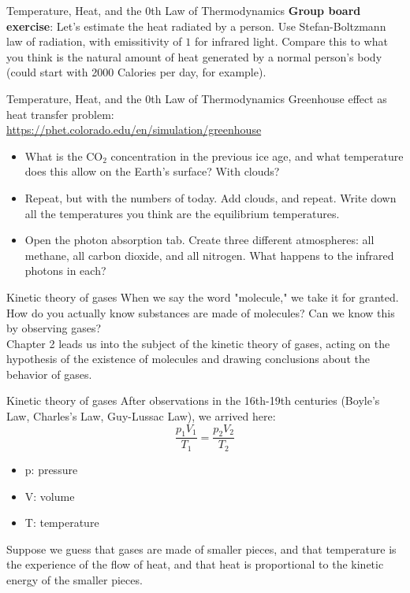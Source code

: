 \documentclass{beamer}
\begin{document}
\begin{frame}{Temperature, Heat, and the 0th Law of Thermodynamics}
\textbf{Group board exercise}: Let's estimate the heat radiated by a person.  Use Stefan-Boltzmann law of radiation, with emissitivity of $1$ for infrared light.  Compare this to what you think is the natural amount of heat generated by a normal person's body (could start with 2000 Calories per day, for example).
\end{frame}

\begin{frame}{Temperature, Heat, and the 0th Law of Thermodynamics}
\small
Greenhouse effect as heat transfer problem: \\ \url{https://phet.colorado.edu/en/simulation/greenhouse}
\begin{itemize}
\item What is the CO$_2$ concentration in the previous ice age, and what temperature does this allow on the Earth's surface?  With clouds?
\item Repeat, but with the numbers of today.  Add clouds, and repeat.  Write down all the temperatures you think are the equilibrium temperatures.
\item Open the photon absorption tab.  Create three different atmospheres: all methane, all carbon dioxide, and all nitrogen.  What happens to the infrared photons in each?
\end{itemize}
\end{frame}

\begin{frame}{Kinetic theory of gases}
When we say the word "molecule," we take it for granted.  How do you actually know substances are made of molecules?  Can we know this by observing gases? \\ \vspace{1cm}
Chapter 2 leads us into the subject of the \alert{kinetic theory of gases}, acting on the hypothesis of the existence of molecules and drawing conclusions about the behavior of gases.
\end{frame}

\begin{frame}{Kinetic theory of gases}
After observations in the 16th-19th centuries (Boyle's Law, Charles's Law, Guy-Lussac Law), we arrived here: \\ \vspace{1cm}
\begin{equation}
\frac{p_1 V_1}{T_1} = \frac{p_2 V_2}{T_2}
\end{equation}
\begin{itemize}
\item p: pressure
\item V: volume
\item T: temperature
\end{itemize}
Suppose we guess that gases are made of smaller pieces, and that temperature is the experience of the flow of heat, and that heat is proportional to the kinetic energy of the smaller pieces.
\end{frame}
\end{document}
